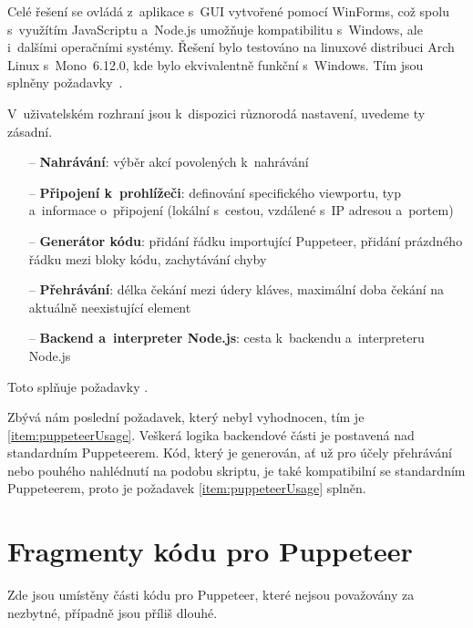 \documentclass[12pt, a4paper, twoside]{article}
\begin{document}
	Celé řešení se ovládá z~aplikace s~GUI vytvořené pomocí WinForms, což spolu s~využítím JavaScriptu a~Node.js umožňuje kompatibilitu s~Windows, ale i~dalšími operačními systémy. Řešení bylo testováno na linuxové distribuci Arch Linux s~Mono~6.12.0, kde bylo ekvivalentně funkční s~Windows. Tím jsou splněny požadavky~\mbox{}.
	
	V~uživatelském rozhraní jsou k~dispozici různorodá nastavení, uvedeme ty zásadní.
	\begin{itemize}
		\item[--] \textbf{Nahrávání}: výběr akcí povolených k~nahrávání
		\item[--] \textbf{Připojení k~prohlížeči}: definování specifického viewportu, typ a~informace o~připojení  (lokální s~cestou, vzdálené s~IP adresou a~portem)
		\item[--] \textbf{Generátor kódu}: přidání řádku importující Puppeteer, přidání prázdného řádku mezi bloky kódu, zachytávání chyby
		\item[--] \textbf{Přehrávání}: délka čekání mezi údery kláves, maximální doba čekání na aktuálně neexistující element
		\item[--] \textbf{Backend a~interpreter Node.js}: cesta k~backendu a~interpreteru Node.js
	\end{itemize}
	Toto splňuje požadavky .
	
	Zbývá nám poslední požadavek, který nebyl vyhodnocen, tím je \cref{item:puppeteerUsage}. Veškerá logika backendové části je postavená nad standardním Puppeteerem. Kód, který je generován, ať už pro účely přehrávání nebo pouhého nahlédnutí na podobu skriptu, je také kompatibilní se standardním Puppeteerem, proto je požadavek \cref{item:puppeteerUsage} splněn.
	\newpage
	\setcounter{secnumdepth}{2}
	\setcounter{section}{0}
	\appendix
	\section{Fragmenty kódu pro Puppeteer}
	\label{appx:puppeteerCode}
	Zde jsou umístěny části kódu pro Puppeteer, které nejsou považovány za nezbytné, případně jsou příliš dlouhé.
\end{document}
